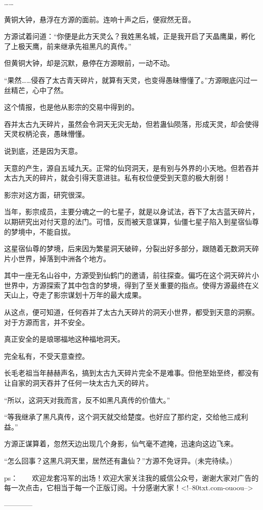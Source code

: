 \begin{this_body}
……

黄铜大钟，悬浮在方源的面前。连响十声之后，便寂然无音。

方源试着问道：“你便是此方天灵么？我姓黑名城，正是我开启了天晶鹰巢，孵化了上极天鹰，前来继承先祖黑凡的真传。”

但黄铜大钟，却是沉默，悬停在方源眼前，一动不动。

“果然……侵吞了太古青天碎片，就算有天灵，也变得愚昧懵懂了。”方源眼底闪过一丝精芒，心中了然。

这个情报，也是他从影宗的交易中得到的。

吞并太古九天碎片，虽然会令洞天无灾无劫，但若蛊仙陨落，形成天灵，却会使得天灵权柄沦丧，愚昧懵懂。

说到底，还是因为天意。

天意的产生，源自五域九天。正常的仙窍洞天，是有别与外界的小天地。但若吞并太古九天的碎片，就会引得天意进驻。私有权位便受到天意的极大削弱！

影宗对这方面，研究很深。

当年，影宗成员，主要分魂之一的七星子，就是以身试法，吞下了太古蓝天碎片，以期研究出对付天意的法门。可惜，反而被天意谋算，仙僵七星子陷入到星宿仙尊的梦境中，不能自拔。

这星宿仙尊的梦境，后来因为繁星洞天破碎，分裂出好多部分，跟随着无数洞天碎片小世界，掉落到中洲各个地方。

其中一座无名山谷中，方源受到仙鹤门的邀请，前往探查。偏巧在这个洞天碎片小世界中，方源探索了其中包含的梦境，得到了至关重要的指点。使得方源最终在义天山上，夺走了影宗谋划十万年的最大成果。

从这点，便可知道，任何吞并了太古九天碎片的洞天小世界，都受到天意的洞察。对于方源而言，并不安全。

真正安全的是琅琊福地这种福地洞天。

完全私有，不受天意查控。

长毛老祖当年赫赫声名，搞到太古九天碎片完全不是难事。但他至始至终，都没有让自家的洞天吞并了任何一块太古九天的碎片。

“所以，这洞天对我而言，反不如黑凡真传的价值大。”

“等我继承了黑凡真传，这个洞天就交给楚度。也好应了那约定，交给他三成利益。”

方源正谋算着，忽然天边出现几个身影，仙气毫不遮掩，迅速向这边飞来。

“怎么回事？这黑凡洞天里，居然还有蛊仙？”方源不免讶异。(未完待续。)

ps：　　欢迎龙套冯军的出场！欢迎大家关注我的威信公众号，谢谢大家对广告的每一次点击，它相当于每一个正版订阅。十分感谢大家！<!--80txt.com-ouoou-->

------------

\end{this_body}

